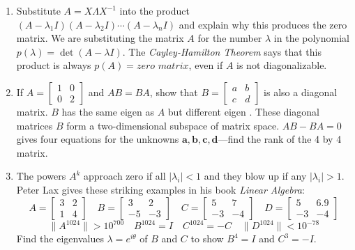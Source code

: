 \documentclass[14pt, a4paper]{article}
\begin{document}
\begin{enumerate}[resume]
    \item Substitute $A = X\Lambda X^{-1}$ into the product $(A - \lambda_1 I)(A - \lambda_2 I) \cdots (A - \lambda_n I)$ and explain why this produces the zero matrix. We are substituting the matrix $A$ for the number $\lambda$ in the polynomial $p(\lambda) = \det(A - \lambda I)$. The \textit{Cayley-Hamilton Theorem} says that this product is always $p(A) = \textit{zero matrix}$, even if $A$ is not diagonalizable.

    \item If $A = \begin{bmatrix} 1 & 0 \\ 0 & 2 \end{bmatrix}$ and $AB = BA$, show that $B = \begin{bmatrix} a & b \\ c & d \end{bmatrix}$ is also a diagonal matrix. $B$ has the same eigen\underline{\hspace{1cm}} as $A$ but different eigen\underline{\hspace{1cm}} . These diagonal matrices $B$ form a two-dimensional subspace of matrix space. $AB - BA = 0$ gives four equations for the unknowns $\mathbf{a, b, c, d}$---find the rank of the 4 by 4 matrix.

    \item The powers $A^k$ approach zero if all $|\lambda_i| < 1$ and they blow up if any $|\lambda_i| > 1$. Peter Lax gives these striking examples in his book \textit{Linear Algebra}:
          \[
              A = \begin{bmatrix} 3 & 2 \\ 1 & 4 \end{bmatrix} \quad B = \begin{bmatrix} 3 & 2 \\ -5 & -3 \end{bmatrix} \quad C = \begin{bmatrix} 5 & 7 \\ -3 & -4 \end{bmatrix} \quad D = \begin{bmatrix} 5 & 6.9 \\ -3 & -4 \end{bmatrix}
          \]
          \[
              \|A^{1024}\| > 10^{700} \quad B^{1024} = I \quad C^{1024} = -C \quad \|D^{1024}\| < 10^{-78}
          \]
          Find the eigenvalues $\lambda = e^{i\theta}$ of $B$ and $C$ to show $B^4 = I$ and $C^3 = -I$.
\end{enumerate}
\end{document}

